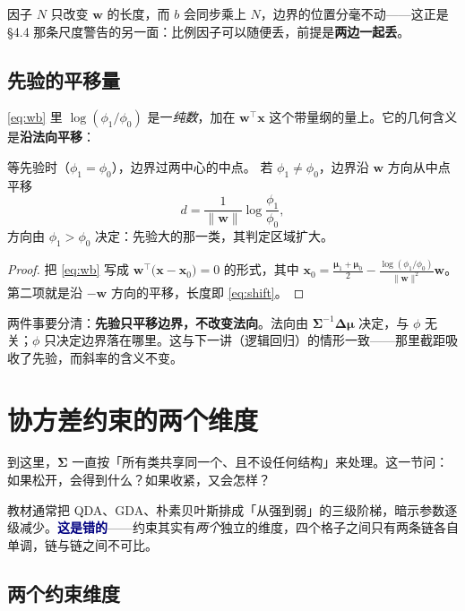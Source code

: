 \documentclass[11pt,a4paper,fontset=windows,zihao=-4]{ctexart}
\newcommand{\bw}{\mathbf{w}}
\newcommand{\bx}{\mathbf{x}}
\newcommand{\bSigma}{\boldsymbol{\Sigma}}
\newcommand{\bmu}{\boldsymbol{\mu}}
\newcommand{\bDelta}{\boldsymbol{\Delta}}
\newcommand{\tp}{^{\top}}
\newcommand{\norm}[1]{\lVert #1\rVert}
\newcommand{\hl}[1]{\textcolor{navy}{\textbf{#1}}}
\begin{document}
因子 $N$ 只改变 $\bw$ 的长度，而 $b$ 会同步乘上 $N$，边界的位置分毫不动——这正是 §4.4 那条尺度警告的另一面：比例因子可以随便丢，前提是\textbf{两边一起丢}。

\subsection{先验的平移量}

\eqref{eq:wb} 里 $\log(\phi_1/\phi_0)$ 是一\emph{纯数}，加在 $\bw\tp\bx$ 这个带量纲的量上。它的几何含义是\textbf{沿法向平移}：

\begin{prop}[先验的平移量]
等先验时（$\phi_1=\phi_0$），边界过两中心的中点。
若 $\phi_1\ne\phi_0$，边界沿 $\bw$ 方向从中点平移
\begin{equation}
  d=\frac{1}{\norm{\bw}}\log\frac{\phi_1}{\phi_0},
  \label{eq:shift}
\end{equation}
方向由 $\phi_1>\phi_0$ 决定：先验大的那一类，其判定区域扩大。
\end{prop}

\begin{proof}
把 \eqref{eq:wb} 写成 $\bw\tp\bigl(\bx-\bx_0\bigr)=0$ 的形式，其中 $\bx_0=\frac{\bmu_1+\bmu_0}{2}-\frac{\log(\phi_1/\phi_0)}{\norm{\bw}^2}\bw$。第二项就是沿 $-\bw$ 方向的平移，长度即 \eqref{eq:shift}。
\end{proof}

两件事要分清：\textbf{先验只平移边界，不改变法向}。法向由 $\bSigma^{-1}\bDelta\bmu$ 决定，与 $\phi$ 无关；$\phi$ 只决定边界落在哪里。这与下一讲（逻辑回归）的情形一致——那里截距吸收了先验，而斜率的含义不变。


\section{协方差约束的两个维度}

到这里，$\bSigma$ 一直按「所有类共享同一个、且不设任何结构」来处理。这一节问：如果松开，会得到什么？如果收紧，又会怎样？

教材通常把 QDA、GDA、朴素贝叶斯排成「从强到弱」的三级阶梯，暗示参数逐级减少。\hl{这是错的}——约束其实有\emph{两个}独立的维度，四个格子之间只有两条链各自单调，链与链之间不可比。

\subsection{两个约束维度}
\end{document}
